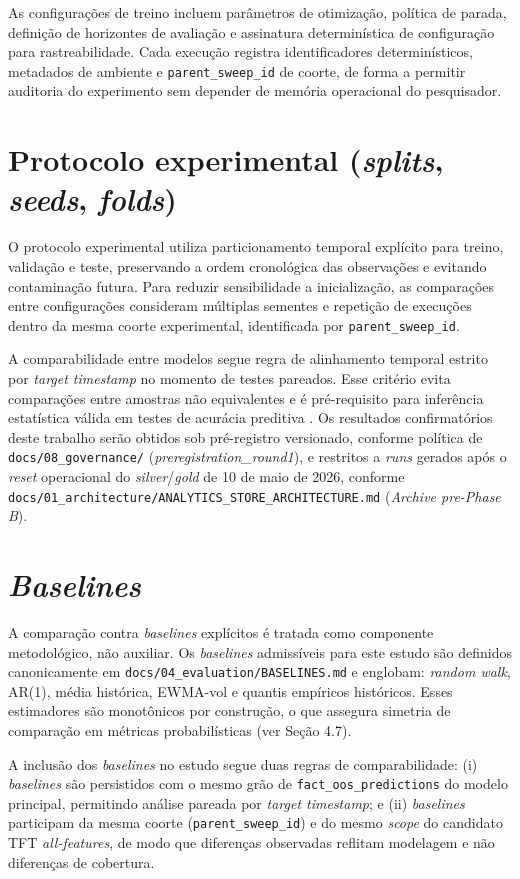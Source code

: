 As configurações de treino incluem parâmetros de otimização, política de parada, definição de horizontes de avaliação e assinatura determinística de configuração para rastreabilidade. Cada execução registra identificadores determinísticos, metadados de ambiente e \texttt{parent\_sweep\_id} de coorte, de forma a permitir auditoria do experimento sem depender de memória operacional do pesquisador.

\section{Protocolo experimental (\textit{splits}, \textit{seeds}, \textit{folds})}
O protocolo experimental utiliza particionamento temporal explícito para treino, validação e teste, preservando a ordem cronológica das observações e evitando contaminação futura. Para reduzir sensibilidade a inicialização, as comparações entre configurações consideram múltiplas sementes e repetição de execuções dentro da mesma coorte experimental, identificada por \texttt{parent\_sweep\_id}.

A comparabilidade entre modelos segue regra de alinhamento temporal estrito por \textit{target timestamp} no momento de testes pareados. Esse critério evita comparações entre amostras não equivalentes e é pré-requisito para inferência estatística válida em testes de acurácia preditiva \cite{DIEBOLDMARIANO1995}. Os resultados confirmatórios deste trabalho serão obtidos sob pré-registro versionado, conforme política de \texttt{docs/08\_governance/} (\textit{preregistration\_round1}), e restritos a \textit{runs} gerados após o \textit{reset} operacional do \textit{silver}/\textit{gold} de 10 de maio de 2026, conforme \texttt{docs/01\_architecture/ANALYTICS\_STORE\_ARCHITECTURE.md} (\textit{Archive pre-Phase B}).

\section{\textit{Baselines}}
A comparação contra \textit{baselines} explícitos é tratada como componente metodológico, não auxiliar. Os \textit{baselines} admissíveis para este estudo são definidos canonicamente em \texttt{docs/04\_evaluation/BASELINES.md} e englobam: \textit{random walk}, AR(1), média histórica, EWMA-vol e quantis empíricos históricos. Esses estimadores são monotônicos por construção, o que assegura simetria de comparação em métricas probabilísticas (ver Seção 4.7).

A inclusão dos \textit{baselines} no estudo segue duas regras de comparabilidade: (i) \textit{baselines} são persistidos com o mesmo grão de \texttt{fact\_oos\_predictions} do modelo principal, permitindo análise pareada por \textit{target timestamp}; e (ii) \textit{baselines} participam da mesma coorte (\texttt{parent\_sweep\_id}) e do mesmo \textit{scope} do candidato TFT \textit{all-features}, de modo que diferenças observadas reflitam modelagem e não diferenças de cobertura.

